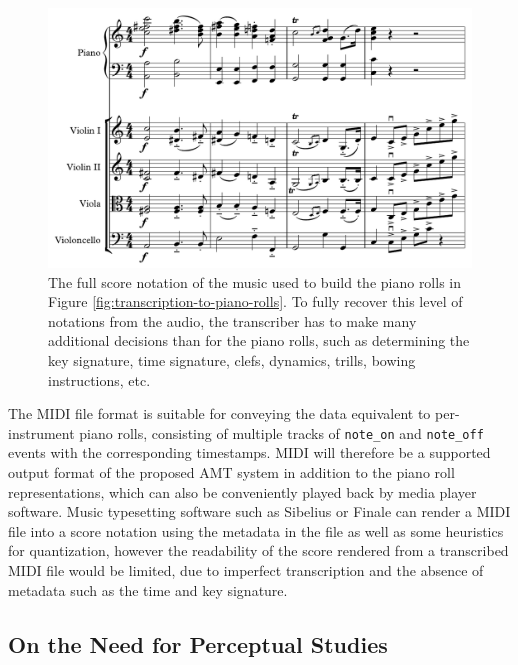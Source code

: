 \begin{figure}
	\includegraphics[width=\textwidth]{march-score.pdf}
	\caption{The full score notation of the music used to build the piano rolls in Figure \ref{fig:transcription-to-piano-rolls}. To fully recover this level of notations from the audio, the transcriber has to make many additional decisions than for the piano rolls, such as determining the key signature, time signature, clefs, dynamics, trills, bowing instructions, etc.}\label{fig:wedding-march-score}
\end{figure}


The MIDI file format is suitable for conveying the data equivalent to per-instrument piano rolls, consisting of multiple tracks of \texttt{note\_on} and \texttt{note\_off} events with the corresponding timestamps.
MIDI will therefore be a supported output format of the proposed AMT system in addition to the piano roll representations, which can also be conveniently played back by media player software.
Music typesetting software such as Sibelius or Finale can render a MIDI file into a score notation using the metadata in the file as well as some heuristics for quantization, however the readability of the score rendered from a transcribed MIDI file would be limited, due to imperfect transcription and the absence of metadata such as the time and key signature.



\subsection{On the Need for Perceptual Studies}


